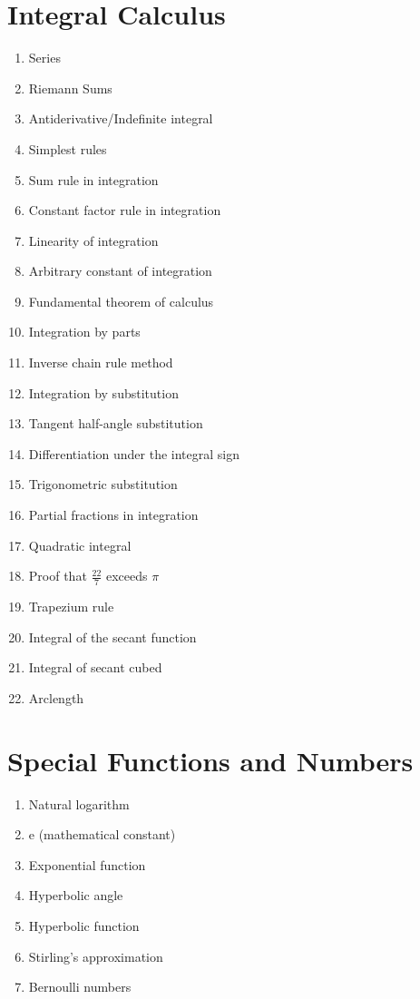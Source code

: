\section{Integral Calculus}
\begin{enumerate}
\item Series
\item Riemann Sums
\item Antiderivative/Indefinite integral
\item Simplest rules
\item Sum rule in integration
\item Constant factor rule in integration
\item Linearity of integration
\item Arbitrary constant of integration
\item Fundamental theorem of calculus
\item Integration by parts
\item Inverse chain rule method
\item Integration by substitution
\item Tangent half-angle substitution
\item Differentiation under the integral sign
\item Trigonometric substitution
\item Partial fractions in integration
\item Quadratic integral
\item Proof that $\frac{22}{7}$ exceeds $\pi$
\item Trapezium rule
\item Integral of the secant function
\item Integral of secant cubed
\item Arclength
\end{enumerate}

\section{Special Functions and Numbers}
\begin{enumerate}
\item Natural logarithm
\item e (mathematical constant)
\item Exponential function
\item Hyperbolic angle
\item Hyperbolic function
\item Stirling's approximation
\item Bernoulli numbers
\end{enumerate}

